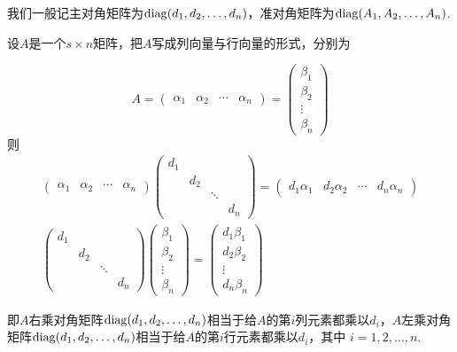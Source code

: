 我们一般记主对角矩阵为$\operatorname{diag}(d_1,d_2,\dots,d_n)$，准对角矩阵为$\operatorname{diag}(A_1,A_2,\dots,A_n)$.
\begin{theorem}\label{thm:12:对角矩阵的性质}
    设$A$是一个$s \times n$矩阵，把$A$写成列向量与行向量的形式，分别为

    \[ A = \begin{pmatrix}\alpha_1 & \alpha_2 & \cdots & \alpha_n\end{pmatrix} = \begin{pmatrix} \beta_1 \\ \beta_2 \\ \vdots \\ \beta_n \end{pmatrix} \]
    则
    \begin{gather*}
        \begin{pmatrix}\alpha_1 & \alpha_2 & \cdots & \alpha_n\end{pmatrix}
        \begin{pmatrix}
            d_1 &     &        &     \\
                & d_2 &        &     \\
                &     & \ddots &     \\
                &     &        & d_n
        \end{pmatrix} = \begin{pmatrix}d_1\alpha_1 & d_2\alpha_2 & \cdots & d_n\alpha_n\end{pmatrix} \\
        \begin{pmatrix}
            d_1 &     &        &     \\
                & d_2 &        &     \\
                &     & \ddots &     \\
                &     &        & d_n
        \end{pmatrix} \begin{pmatrix} \beta_1 \\ \beta_2 \\ \vdots \\ \beta_n \end{pmatrix} = \begin{pmatrix} d_1\beta_1 \\ d_2\beta_2 \\ \vdots \\ d_n\beta_n \end{pmatrix}
    \end{gather*}

    即$A$右乘对角矩阵$\operatorname{diag}(d_1,d_2,\ldots,d_n)$相当于给$A$的第$i$列元素都乘以$d_i$，$A$左乘对角矩阵$\operatorname{diag}(d_1,d_2,\ldots,d_n)$相当于给$A$的第$i$行元素都乘以$d_i$，其中 $i=1,2,\ldots,n$.
\end{theorem}

